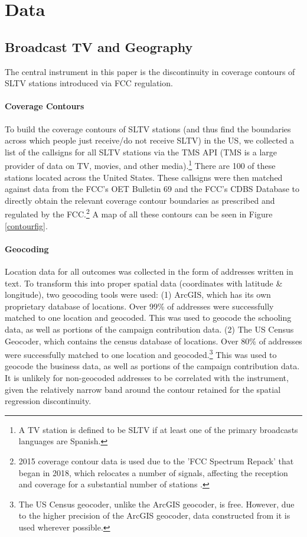 \documentclass[11pt]{article}
\begin{document}
\section{Data}\label{secdata}


\subsection{Broadcast TV and Geography}

The central instrument in this paper is the discontinuity in coverage contours of SLTV stations introduced via FCC regulation.

\paragraph{Coverage Contours} 

To build the coverage contours of SLTV stations (and thus find the boundaries across which people just receive/do not receive SLTV) in the US, we collected a list of the callsigns for all SLTV stations via the TMS API (TMS is a large provider of data on TV, movies, and other media).\footnote{ A TV station is defined to be SLTV if at least one of the primary broadcasts languages are Spanish.} There are 100 of these stations located across the United States. These callsigns were then matched against data from the FCC's OET Bulletin 69 and the FCC's CDBS Database to directly obtain the relevant coverage contour boundaries as prescribed and regulated by the FCC.\footnote{ 2015 coverage contour data is used due to the 'FCC Spectrum Repack' that began in 2018, which relocates a number of signals, affecting the reception and coverage for a substantial number of stations \citep{fletcher_fcc_2018}.} 
A map of all these contours can be seen in Figure \ref{contourfig}.

\paragraph{Geocoding}

Location data for all outcomes was collected in the form of addresses written in text. To transform this into proper spatial data (coordinates with latitude \& longitude), two geocoding tools were used: (1) ArcGIS, which has its own proprietary database of locations. Over 99\% of addresses were successfully matched to one location and geocoded. This was used to geocode the schooling data, as well as portions of the campaign contribution data. (2) The US Census Geocoder, which contains the census database of locations. Over 80\% of addresses were successfully matched to one location and geocoded.\footnote{The US Census geocoder, unlike the ArcGIS geocoder, is free. However, due to the higher precision of the ArcGIS geocoder, data constructed from it is used wherever possible. } This was used to geocode the business data, as well as portions of the campaign contribution data. It is unlikely for non-geocoded addresses to be correlated with the instrument, given the relatively narrow band around the contour retained for the spatial regression discontinuity.
\end{document}
